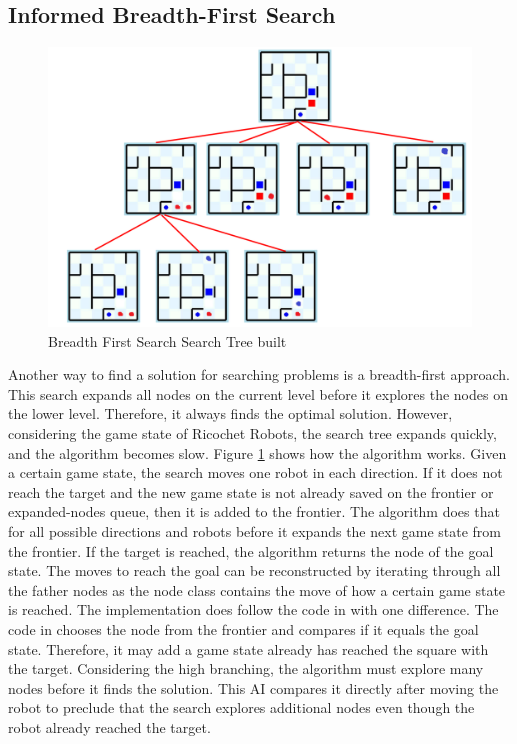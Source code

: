 \documentclass[a4paper,10pt]{article}
\begin{document}
  \subsection{Informed Breadth-First Search}
  \begin{figure}
  	\centering

  	\includegraphics[scale=0.50]{figures/bfs_tree.PNG}
  	\caption{Breadth First Search Search Tree built}
  	\label{fig:bfs_tree}
  \end{figure}
  Another way to find a solution for searching problems is a breadth-first approach. This search expands all nodes on the current level before it explores the nodes on the lower level. Therefore, it always finds the optimal solution. However, considering the game state of Ricochet Robots, the search tree expands quickly, and the algorithm becomes slow. Figure \ref{fig:bfs_tree} shows how the algorithm works. Given a certain game state, the search moves one robot in each direction. If it does not reach the target and the new game state is not already saved on the frontier or expanded-nodes queue, then it is added to the frontier. The algorithm does that for all possible directions and robots before it expands the next game state from the frontier. If the target is reached, the algorithm returns the node of the goal state. The moves to reach the goal can be reconstructed by iterating through all the father nodes as the node class contains the move of how a certain game state is reached. The implementation does follow the code in \cite{Textbook} with one difference. The code in \cite{Textbook} chooses the node from the frontier and compares if it equals the goal state. Therefore, it may add a game state already has reached the square with the target. Considering the high branching, the algorithm must explore many nodes before it finds the solution. This AI compares it directly after moving the robot to preclude that the search explores additional nodes even though the robot already reached the target.\\
\end{document}
